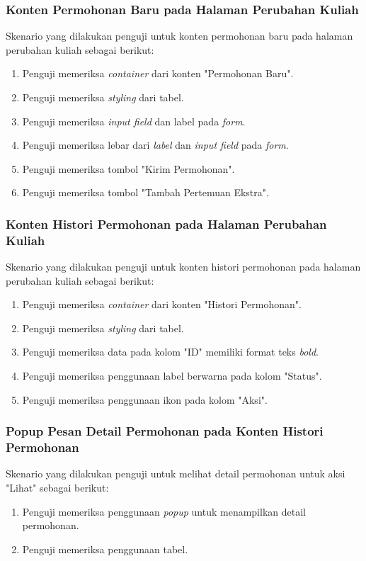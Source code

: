 \subsubsection{Konten Permohonan Baru pada Halaman Perubahan Kuliah}
Skenario yang dilakukan penguji untuk konten permohonan baru pada halaman perubahan kuliah sebagai berikut:
\begin{enumerate}
	\item Penguji memeriksa \textit{container} dari konten "Permohonan Baru".
	\item Penguji memeriksa \textit{styling} dari tabel.	
	\item Penguji memeriksa \textit{input field} dan label pada \textit{form}.
	\item Penguji memeriksa lebar dari \textit{label} dan \textit{input field} pada \textit{form}.
	\item Penguji memeriksa tombol "Kirim Permohonan".
	\item Penguji memeriksa tombol "Tambah Pertemuan Ekstra".
\end{enumerate}

\subsubsection{Konten Histori Permohonan pada Halaman Perubahan Kuliah}
Skenario yang dilakukan penguji untuk konten histori permohonan pada halaman perubahan kuliah sebagai berikut:
\begin{enumerate}
	\item Penguji memeriksa \textit{container} dari konten "Histori Permohonan".
	\item Penguji memeriksa \textit{styling} dari tabel.	
	\item Penguji memeriksa data pada kolom "ID" memiliki format teks \textit{bold}.
	\item Penguji memeriksa penggunaan label berwarna pada kolom "Status".			
	\item Penguji memeriksa penggunaan ikon pada kolom "Aksi".
\end{enumerate}

\subsubsection{Popup Pesan Detail Permohonan pada Konten Histori Permohonan}
Skenario yang dilakukan penguji untuk melihat detail permohonan untuk aksi "Lihat" sebagai berikut:
\begin{enumerate}
	\item Penguji memeriksa penggunaan \textit{popup} untuk menampilkan detail permohonan.
	\item Penguji memeriksa penggunaan tabel.	
\end{enumerate}

